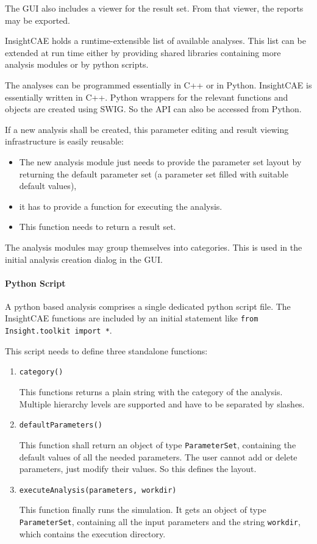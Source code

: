 The GUI also includes a viewer for the result set. From that viewer, the reports may be exported.

InsightCAE holds a runtime-extensible list of available analyses.
This list can be extended at run time either by providing shared libraries containing more analysis modules or by python scripts.

The analyses can be programmed essentially in C++ or in Python.
InsightCAE is essentially written in C++. Python wrappers for the relevant functions and objects are created using SWIG. So the API can also be accessed from Python.

If a new analysis shall be created, this parameter editing and result viewing infrastructure is easily reusable:
\begin{itemize}
\item The new analysis module just needs to provide the parameter set layout by returning the default parameter set (a parameter set filled with suitable default values),
\item it has to provide a function for executing the analysis.
\item This function needs to return a result set.
\end{itemize}

The analysis modules may group themselves into categories. This is used in the initial analysis creation dialog in the GUI.

\paragraph{Python Script}

A python based analysis comprises a single dedicated python script file.
The InsightCAE functions are included by an initial statement like \verb!from Insight.toolkit import *!.

This script needs to define three standalone functions:
\begin{enumerate}
\item \verb!category()!

This functions returns a plain string with the category of the analysis. Multiple hierarchy levels are supported and have to be separated by slashes.

\item \verb!defaultParameters()!

This function shall return an object of type \texttt{ParameterSet}, containing the default values of all the needed parameters. The user cannot add or delete parameters, just modify their values. So this defines the layout.

\item \verb!executeAnalysis(parameters, workdir)!

This function finally runs the simulation.
It gets an object of type \verb!ParameterSet!, containing all the input parameters and the string \texttt{workdir}, which contains the execution directory.

\end{enumerate}

